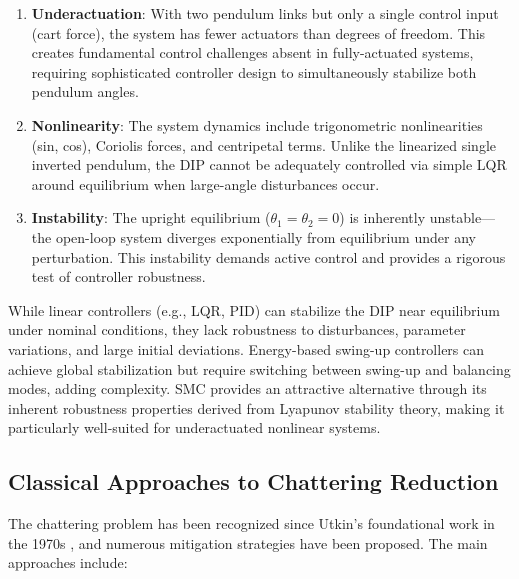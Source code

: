 \begin{enumerate}
    \item \textbf{Underactuation}: With two pendulum links but only a single control input (cart force), the system has fewer actuators than degrees of freedom. This creates fundamental control challenges absent in fully-actuated systems, requiring sophisticated controller design to simultaneously stabilize both pendulum angles.

    \item \textbf{Nonlinearity}: The system dynamics include trigonometric nonlinearities (sin, cos), Coriolis forces, and centripetal terms. Unlike the linearized single inverted pendulum, the DIP cannot be adequately controlled via simple LQR around equilibrium when large-angle disturbances occur.

    \item \textbf{Instability}: The upright equilibrium ($\theta_1 = \theta_2 = 0$) is inherently unstable—the open-loop system diverges exponentially from equilibrium under any perturbation. This instability demands active control and provides a rigorous test of controller robustness.
\end{enumerate}

While linear controllers (e.g., LQR, PID) can stabilize the DIP near equilibrium under nominal conditions, they lack robustness to disturbances, parameter variations, and large initial deviations. Energy-based swing-up controllers can achieve global stabilization but require switching between swing-up and balancing modes, adding complexity. SMC provides an attractive alternative through its inherent robustness properties derived from Lyapunov stability theory, making it particularly well-suited for underactuated nonlinear systems.

\subsection{Classical Approaches to Chattering Reduction}

The chattering problem has been recognized since Utkin's foundational work in the 1970s \cite{utkin1992sliding}, and numerous mitigation strategies have been proposed. The main approaches include:

